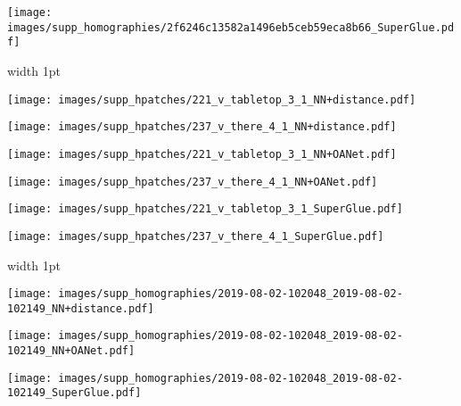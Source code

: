\documentclass[10pt,twocolumn,letterpaper]{article}
\renewcommand{\*}[1]{\mathbf{#1}}
\newcommand{\0}{\phantom{0}}
\begin{document}
\begin{figure*}[ht!]
\begin{minipage}{\iwidth\textwidth}
    \vspace{.5mm}
    \texttt{[image: images/supp\_homographies/2f6246c13582a1496eb5ceb59eca8b66\_SuperGlue.pdf]}
\end{minipage}

\vspace{1.5mm}
\begin{minipage}{0.02\textwidth}
\end{minipage}\hfill{\vline width 1pt}\hfill
\hspace{1mm}\begin{minipage}{\iwidth\textwidth}
    \texttt{[image: images/supp\_hpatches/221\_v\_tabletop\_3\_1\_NN+distance.pdf]}
    
    \vspace{.5mm}
    \texttt{[image: images/supp\_hpatches/237\_v\_there\_4\_1\_NN+distance.pdf]}
\end{minipage}\hspace{1mm}\begin{minipage}{\iwidth\textwidth}
    \texttt{[image: images/supp\_hpatches/221\_v\_tabletop\_3\_1\_NN+OANet.pdf]}
    
    \vspace{.5mm}
    \texttt{[image: images/supp\_hpatches/237\_v\_there\_4\_1\_NN+OANet.pdf]}
\end{minipage}\hspace{1mm}\begin{minipage}{\iwidth\textwidth}
    \texttt{[image: images/supp\_hpatches/221\_v\_tabletop\_3\_1\_SuperGlue.pdf]}
    
    \vspace{.5mm}
    \texttt{[image: images/supp\_hpatches/237\_v\_there\_4\_1\_SuperGlue.pdf]}
\end{minipage}

\vspace{1.5mm}
\begin{minipage}{0.02\textwidth}
\end{minipage}\hfill{\vline width 1pt}\hfill
\hspace{1mm}\begin{minipage}{\iwidth\textwidth}
    \texttt{[image: images/supp\_homographies/2019-08-02-102048\_2019-08-02-102149\_NN+distance.pdf]}
\end{minipage}\hspace{1mm}\begin{minipage}{\iwidth\textwidth}
    \texttt{[image: images/supp\_homographies/2019-08-02-102048\_2019-08-02-102149\_NN+OANet.pdf]}
\end{minipage}\hspace{1mm}\begin{minipage}{\iwidth\textwidth}
    \texttt{[image: images/supp\_homographies/2019-08-02-102048\_2019-08-02-102149\_SuperGlue.pdf]}
\end{minipage}


\end{figure*}
\end{document}
